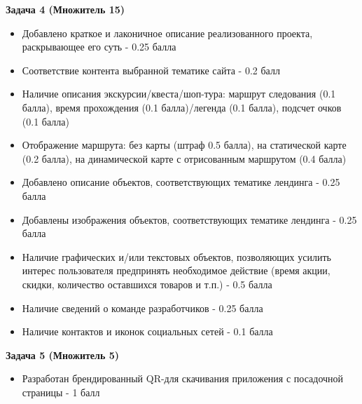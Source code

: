 \textbf{Задача 4 (Множитель 15)}
\begin{itemize}
    \item Добавлено краткое и лаконичное описание реализованного проекта, раскрывающее его суть - 0.25 балла
    \item Соответствие контента выбранной тематике сайта - 0.2 балл
    \item Наличие описания экскурсии/квеста/шоп-тура: маршрут следования (0.1 балла), время прохождения (0.1 балла)/легенда (0.1 балла), подсчет очков (0.1 балла)
    \item Отображение маршрута:  без карты (штраф 0.5 балла), на статической карте (0.2 балла), на динамической карте с отрисованным маршрутом (0.4 балла)
    \item Добавлено описание объектов, соответствующих тематике лендинга  - 0.25 балла
    \item Добавлены изображения объектов, соответствующих тематике лендинга - 0.25 балла
    \item Наличие графических и/или текстовых объектов, позволяющих усилить интерес пользователя предпринять необходимое действие (время акции, скидки, количество оставшихся товаров и т.п.) - 0.5 балла
    \item Наличие сведений о команде разработчиков - 0.25 балла
    \item Наличие контактов и иконок социальных сетей - 0.1 балла
\end{itemize}

\textbf{Задача 5 (Множитель 5)}
\begin{itemize}
    \item Разработан брендированный QR-для скачивания приложения с посадочной страницы - 1 балл
\end{itemize}
